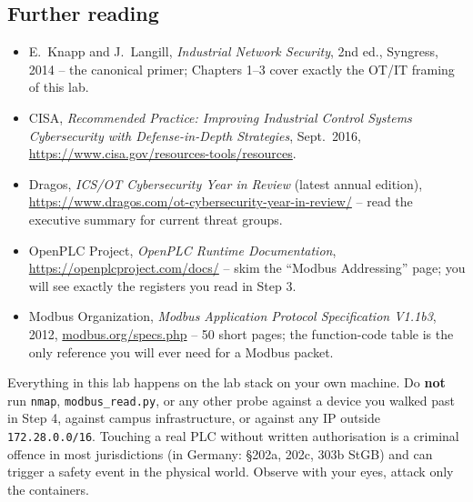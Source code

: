 \documentclass[11pt,a4paper]{article}
\begin{document}
\subsection*{Further reading}
\begin{itemize}\setlength{\itemsep}{1pt}
  \item E.\ Knapp and J.\ Langill, \emph{Industrial Network Security},
        2nd ed., Syngress, 2014 -- the canonical primer; Chapters 1--3
        cover exactly the OT/IT framing of this lab.
  \item CISA, \emph{Recommended Practice: Improving Industrial Control
        Systems Cybersecurity with Defense-in-Depth Strategies},
        Sept.\ 2016, \url{https://www.cisa.gov/resources-tools/resources}.
  \item Dragos, \emph{ICS/OT Cybersecurity Year in Review} (latest
        annual edition), \url{https://www.dragos.com/ot-cybersecurity-year-in-review/}
        -- read the executive summary for current threat groups.
  \item OpenPLC Project, \emph{OpenPLC Runtime Documentation},
        \url{https://openplcproject.com/docs/} -- skim the
        ``Modbus Addressing'' page; you will see exactly the registers
        you read in Step 3.
  \item Modbus Organization, \emph{Modbus Application Protocol
        Specification V1.1b3}, 2012,
        \url{modbus.org/specs.php} -- 50 short pages; the
        function-code table is the only reference you will ever
        need for a Modbus packet.
\end{itemize}

\begin{warnbox}
Everything in this lab happens on the lab stack on your own machine.
Do \textbf{not} run \texttt{nmap}, \texttt{modbus\_read.py}, or any
other probe against a device you walked past in Step 4, against
campus infrastructure, or against any IP outside
\texttt{172.28.0.0/16}. Touching a real PLC without written
authorisation is a criminal offence in most jurisdictions (in Germany:
\S 202a, 202c, 303b StGB) and can trigger a safety event in the
physical world. Observe with your eyes, attack only the containers.
\end{warnbox}
\end{document}
